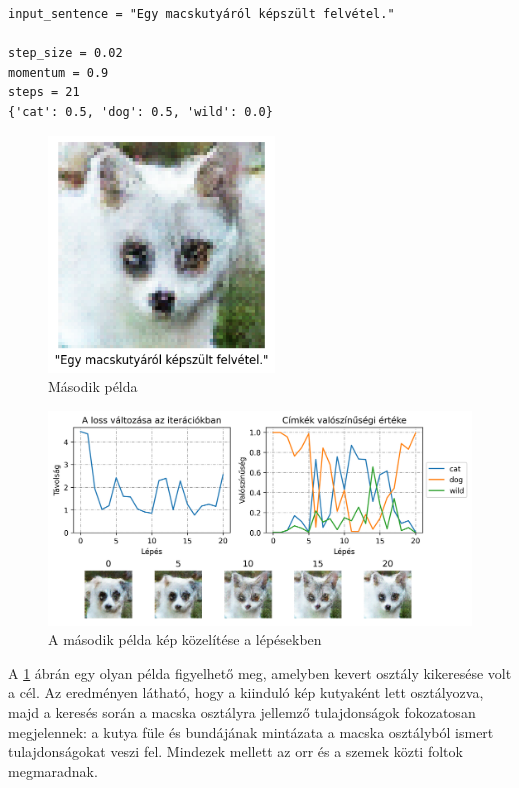 
\begin{verbatim}
input_sentence = "Egy macskutyáról képszült felvétel."

step_size = 0.02
momentum = 0.9
steps = 21
{'cat': 0.5, 'dog': 0.5, 'wild': 0.0}
\end{verbatim}

\begin{figure}[h]
	\centering
	\includegraphics[width=6cm]{images/demo02.png}
	\caption{Második példa}
	\label{fig:demo2}
\end{figure}

\begin{figure}[h]
	\centering
	\includegraphics[width=15cm]{images/demo02_conv.png}
	\caption{A második példa kép közelítése a lépésekben}
	\label{fig:demo2_convergence}
\end{figure}

A \ref{fig:demo2} ábrán egy olyan példa figyelhető meg, amelyben kevert osztály kikeresése volt a cél. Az eredményen látható, hogy a kiinduló kép kutyaként lett osztályozva, majd a keresés során a macska osztályra jellemző tulajdonságok fokozatosan megjelennek: a kutya füle és bundájának mintázata a macska osztályból ismert tulajdonságokat veszi fel. Mindezek mellett az orr és a szemek közti foltok megmaradnak.

